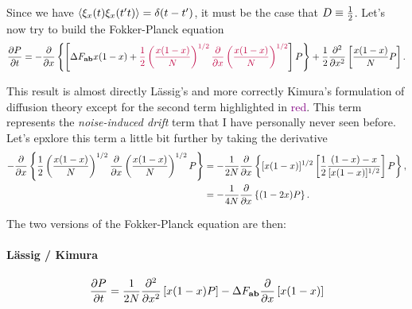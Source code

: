 Since we have $\left\langle \xi_x(t) \xi_x(t't) \right\rangle = \delta(t - t')$, it must be the
case that $D \equiv {1 \over 2}$. Let's now try to build the Fokker-Planck
equation
\begin{equation}
  {\partial P \over \partial t} = - {\partial \over \partial x}
  \left\{ \left[ \Delta F_{\mathbf{ab}} x (1 - x) +
  \textcolor{purple}{{1 \over 2} \left( {x (1 - x) \over N} \right)^{1/2}
  {\partial \over \partial x} \left( x (1 - x) \over N \right)^{1/2}}
  \right] P \right\} +
  {1 \over 2} {\partial^2 \over \partial x^2} \left[ {x (1 - x) \over N} P
  \right].
\end{equation}

This result is almost directly L\"{a}ssig's and more correctly Kimura's formulation
of diffusion theory except for the second term highlighted in
\textcolor{purple}{red}. This term represents the {\it noise-induced drift} term
that I have personally never seen before. Let's epxlore this term a little bit
further by taking the derivative
\begin{align}
  -{\partial \over \partial x} \left\{ {1 \over 2}
  \left( {x (1 - x) \over N} \right)^{1/2}
  {\partial \over \partial x} \left( {x (1 - x) \over N} \right)^{1/2} P
  \right\} &=
  - {1 \over 2 N} {\partial \over \partial x} \left\{ [x (1 - x)]^{1/2}
  \left[ {1 \over 2} {{(1 - x) - x} \over [x (1 - x)]^{1/2}} \right] P
  \right\},\\
  &= -{1 \over 4 N} {\partial \over \partial x}\left\{ (1 - 2 x) P \right\}.
\end{align}

The two versions of the Fokker-Planck equation are then:
\paragraph{L\"{a}ssig / Kimura}
\begin{equation}
  {\partial P \over \partial t} = {1 \over 2N}
  {\partial^2 \over \partial x^2} \left[ x (1 - x) P \right] -
  \Delta F_{\mathbf{ab}} {\partial \over \partial x} \left[ x (1 - x)  \right]
\end{equation}

